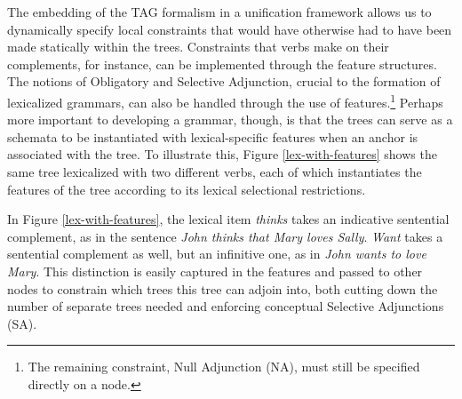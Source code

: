 The embedding of the TAG formalism in a unification framework allows
us to dynamically specify local constraints that would have otherwise
had to have been made statically within the trees.  Constraints that
verbs make on their complements, for instance, can be implemented
through the feature structures.  The notions of Obligatory and
Selective Adjunction, crucial to the formation of lexicalized
grammars, can also be handled through the use of
features.\footnote{The remaining constraint, Null Adjunction (NA),
must still be specified directly on a node.} Perhaps more important to
developing a grammar, though, is that the trees can serve as a
schemata to be instantiated with lexical-specific features when an
anchor is associated with the tree.  To illustrate this, Figure
\ref{lex-with-features} shows the same tree lexicalized with two
different verbs, each of which instantiates the features of the tree
according to its lexical selectional restrictions.

In Figure \ref{lex-with-features}, the lexical item {\it thinks} takes an
indicative sentential complement, as in the sentence {\it John thinks that Mary
loves Sally}.  {\it Want} takes a sentential complement as well, but an
infinitive one, as in {\it John wants to love Mary}.  This distinction is
easily captured in the features and passed to other nodes to constrain which
trees this tree can adjoin into, both cutting down the number of separate trees
needed and enforcing conceptual Selective Adjunctions (SA).


